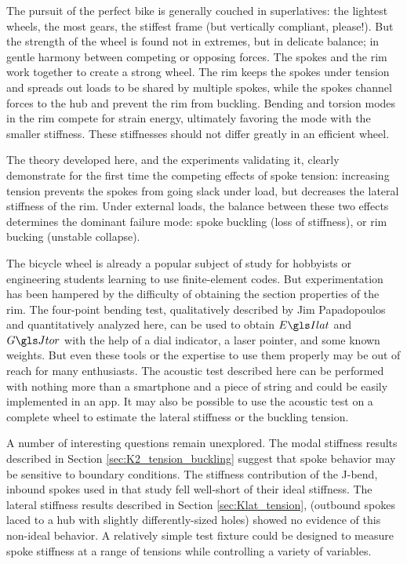 \documentclass[\rootdir/thesis.tex]{subfiles}
\begin{document}
The pursuit of the perfect bike is generally couched in superlatives: the lightest wheels, the most gears, the stiffest frame (but vertically compliant, please!). But the strength of the wheel is found not in extremes, but in delicate balance; in gentle harmony between competing or opposing forces. The spokes and the rim work together to create a strong wheel. The rim keeps the spokes under tension and spreads out loads to be shared by multiple spokes, while the spokes channel forces to the hub and prevent the rim from buckling. Bending and torsion modes in the rim compete for strain energy, ultimately favoring the mode with the smaller stiffness. These stiffnesses should not differ greatly in an efficient wheel.

The theory developed here, and the experiments validating it, clearly demonstrate for the first time the competing effects of spoke tension: increasing tension prevents the spokes from going slack under load, but decreases the lateral stiffness of the rim. Under external loads, the balance between these two effects determines the dominant failure mode: spoke buckling (loss of stiffness), or rim bucking (unstable collapse).

The bicycle wheel is already a popular subject of study for hobbyists or engineering students learning to use finite-element codes. But experimentation has been hampered by the difficulty of obtaining the section properties of the rim. The four-point bending test, qualitatively described by Jim Papadopoulos and quantitatively analyzed here, can be used to obtain $\EIl$ and $\GJ$ with the help of a dial indicator, a laser pointer, and some known weights. But even these tools or the expertise to use them properly may be out of reach for many enthusiasts. The acoustic test described here can be performed with nothing more than a smartphone and a piece of string and could be easily implemented in an app. It may also be possible to use the acoustic test on a complete wheel to estimate the lateral stiffness or the buckling tension.

A number of interesting questions remain unexplored. The modal stiffness results described in Section \ref{sec:K2_tension_buckling} suggest that spoke behavior may be sensitive to boundary conditions. The stiffness contribution of the J-bend, inbound spokes used in that study fell well-short of their ideal stiffness. The lateral stiffness results described in Section \ref{sec:Klat_tension}, (outbound spokes laced to a hub with slightly differently-sized holes) showed no evidence of this non-ideal behavior. A relatively simple test fixture could be designed to measure spoke stiffness at a range of tensions while controlling a variety of variables.
\end{document}
